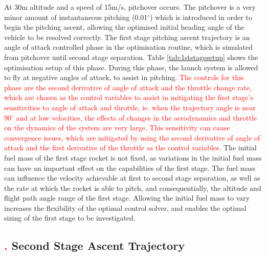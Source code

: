 At 30m altitude and a speed of 15m/s, pitchover occurs. The pitchover is a very minor amount of instantaneous pitching (0.01$^\circ$) which is introduced in order to begin the pitching ascent, allowing the optimised initial heading angle of the vehicle to be resolved correctly. 
The first stage pitching ascent trajectory is an angle of attack controlled phase in the optimisation routine, which is simulated from pitchover until second stage separation. Table \ref{tab:1ststagesetup} shows the optimisation setup of this phase. During this phase, the launch system is allowed to fly at negative angles of attack, to assist in pitching. \textcolor{red}{ The controls for this phase are the second derivative of angle of attack and the throttle change rate, which are chosen as the control variables to assist in mitigating the first stage's sensitivities to angle of attack and throttle, ie. when the trajectory angle is near 90$^\circ$ and at low velocities, the effects of changes in the aerodynamics and throttle on the dynamics of the system are very large. This sensitivity can cause convergence issues, which are mitigated by using the second derivative of angle of attack and the first derivative of the throttle as the control variables. }
The initial fuel mass of the first stage rocket is not fixed, as variations in the initial fuel mass can have an important effect on the capabilities of the first stage. The fuel mass can influence the velocity achievable at first to second stage separation, as well as the rate at which the rocket is able to pitch, and consequentially, the altitude and flight path angle range of the first stage.
Allowing the initial fuel mass to vary increases the flexibility of the optimal control solver, and enables the optimal sizing of the first stage to be investigated. 



\subsection{\textcolor{red}{.} Second Stage Ascent Trajectory}


